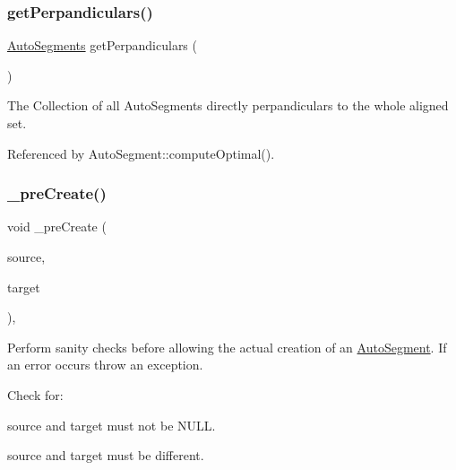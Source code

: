 \mbox{\label{classKatabatic_1_1AutoSegment_aadc6427db83ebdb690e74980d9c8d7d8}} 
\subsubsection{\texorpdfstring{get\+Perpandiculars()}{getPerpandiculars()}}
{\footnotesize\ttfamily \mbox{\hyperlink{namespaceKatabatic_a2221b0ddbc24f331809fc86f98e38041}{Auto\+Segments}} get\+Perpandiculars (\begin{DoxyParamCaption}{ }\end{DoxyParamCaption})}

The Collection of all Auto\+Segments directly perpandiculars to the whole aligned set. 

Referenced by Auto\+Segment\+::compute\+Optimal().

\mbox{\label{classKatabatic_1_1AutoSegment_a8348937b1db79480305b178482d3ed61}} 
\subsubsection{\texorpdfstring{\+\_\+pre\+Create()}{\_preCreate()}}
{\footnotesize\ttfamily void \+\_\+pre\+Create (\begin{DoxyParamCaption}\item[{\mbox{\hyperlink{classKatabatic_1_1AutoContact}{Auto\+Contact}} $\ast$}]{source,  }\item[{\mbox{\hyperlink{classKatabatic_1_1AutoContact}{Auto\+Contact}} $\ast$}]{target }\end{DoxyParamCaption})\hspace{0.3cm}{\ttfamily [static]}, {\ttfamily [protected]}}

Perform sanity checks before allowing the actual creation of an \mbox{\hyperlink{classKatabatic_1_1AutoSegment}{Auto\+Segment}}. If an error occurs throw an exception.

Check for\+:
\begin{DoxyItemize}
\item {\ttfamily source} and {\ttfamily target} must not be {\ttfamily N\+U\+LL}.
\item {\ttfamily source} and {\ttfamily target} must be different. 
\end{DoxyItemize}\mbox{\label{classKatabatic_1_1AutoSegment_a3715b38135ca24745f610bebd3407c10}} 
